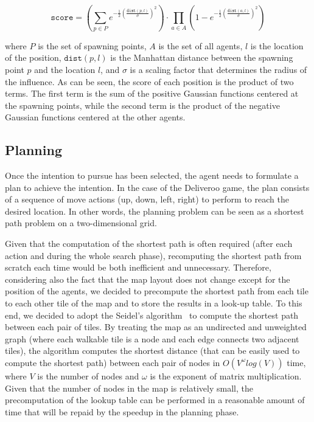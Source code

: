 \begin{equation*}
    \texttt{score} = (\sum \limits_{p \in P} e^{-\frac{1}{2}(\frac{\texttt{dist}(p, l)}{\sigma})^2}) \cdot \prod \limits_{a \in A} (1 - e^{-\frac{1}{2}(\frac{\texttt{dist}(a, l)}{\sigma})^2})
\end{equation*}

where $P$ is the set of spawning points, $A$ is the set of all agents, $l$ is the location of the position, $\texttt{dist}(p, l)$ is the Manhattan distance between the spawning point $p$ and the location $l$, and $\sigma$ is a scaling factor that determines the radius of the influence. As can be seen, the score of each position is the product of two terms. The first term is the sum of the positive Gaussian functions centered at the spawning points, while the second term is the product of the negative Gaussian functions centered at the other agents.


\subsection{Planning}

Once the intention to pursue has been selected, the agent needs to formulate a plan to achieve the intention. In the case of the Deliveroo game, the plan consists of a sequence of move actions (up, down, left, right) to perform to reach the desired location. In other words, the planning problem can be seen as a shortest path problem on a two-dimensional grid.

Given that the computation of the shortest path is often required (after each action and during the whole search phase), recomputing the shortest path from scratch each time would be both inefficient and unnecessary. Therefore, considering also the fact that the map layout does not change except for the position of the agents, we decided to precompute the shortest path from each tile to each other tile of the map and to store the results in a look-up table. To this end, we decided to adopt the Seidel's algorithm~\parencite{seidel} to compute the shortest path between each pair of tiles. By treating the map as an undirected and unweighted graph (where each walkable tile is a node and each edge connects two adjacent tiles), the algorithm computes the shortest distance (that can be easily used to compute the shortest path) between each pair of nodes in $O(V^{\omega} log(V))$ time, where $V$ is the number of nodes and $\omega$ is the exponent of matrix multiplication. Given that the number of nodes in the map is relatively small, the precomputation of the lookup table can be performed in a reasonable amount of time that will be repaid by the speedup in the planning phase.

